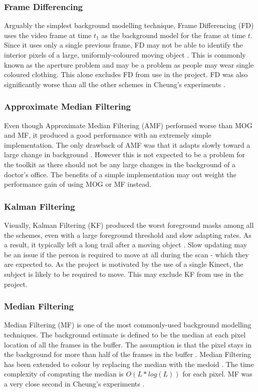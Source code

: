 \subsubsection{Frame Differencing}
Arguably the simplest background modelling technique, Frame Differencing (FD) \cite{rodriguez1995} uses the video frame at time $t_1$ as the background model for the frame at time $t$. Since it uses only a single previous frame, FD may not be able to identify the interior pixels of a large, uniformly-coloured moving object \cite{Cheung2007}. This is commonly known as the aperture problem \cite{pack2001,Cheung2007} and may be a problem as people may wear single coloured clothing. This alone excludes FD from use in the project. FD was also significantly worse than all the other schemes in Cheung's experiments \cite{Cheung2007}.\\

\subsubsection{Approximate Median Filtering} 
Even though Approximate Median Filtering (AMF) \cite{justusson1981} performed worse than MOG and MF, it produced a good performance with an extremely simple implementation. The only drawback of AMF was that it adapts slowly toward a large change in background \cite{Cheung2007}. However this is not expected to be a problem for the toolkit as there should not be any large changes in the background of a doctor's office. The benefits of a  simple implementation may out weight the performance gain of using MOG or MF instead.\\

\subsubsection{Kalman Filtering}
Visually, Kalman Filtering (KF) \cite{haykin2001} produced the worst foreground masks among all the schemes, even with a large foreground threshold and slow adapting rates. As a result, it typically left a long trail after a moving object \cite{Cheung2007}. Slow updating may be an issue if the person is required to move at all during the scan - which they are expected to. As the project is motivated by the use of a single Kinect, the subject is likely to be required to move. This may exclude KF from use in the project.\\

\subsubsection{Median Filtering}
Median Filtering (MF) \cite{huang1979} is one of the most commonly-used background modelling techniques. The background estimate is defined to be the median at each pixel location of all the frames in the buffer. The assumption is that the pixel stays in the background for more than half of the frames in the buffer \cite{Cheung2007}. Median Filtering has been extended to colour by replacing the median with the medoid \cite{Cucchiara2003}. The time complexity of computing the median is $O(L*log(L))$ for each pixel. MF was a very close second in Cheung's experiments \cite{Cheung2007}.\\